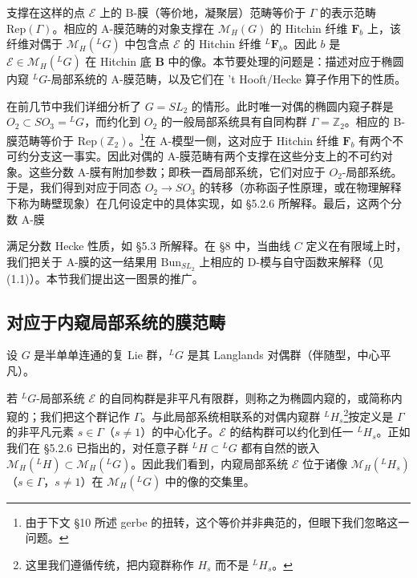 \documentclass[11pt,a4paper]{article}
\newcommand{\Bun}{\mathrm{Bun}}
\begin{document}
支撑在这样的点 $\mathcal{E}$ 上的 B-膜（等价地，凝聚层）范畴等价于 $\Gamma$ 的表示范畴 $\mathrm{Rep}(\Gamma)$。相应的 A-膜范畴的对象支撑在 $\mathcal{M}_H(G)$ 的 Hitchin 纤维 $\boldsymbol{F}_b$ 上，该纤维对偶于 $\mathcal{M}_H({}^{L}G)$ 中包含点 $\mathcal{E}$ 的 Hitchin 纤维 ${}^{L}\boldsymbol{F}_b$。因此 $b$ 是 $\mathcal{E}\in\mathcal{M}_H({}^{L}G)$ 在 Hitchin 底 $\boldsymbol{B}$ 中的像。本节要处理的问题是：描述对应于椭圆内窥 ${}^{L}G$-局部系统的 A-膜范畴，以及它们在 't Hooft/Hecke 算子作用下的性质。

在前几节中我们详细分析了 $G=SL_2$ 的情形。此时唯一对偶的椭圆内窥子群是 $O_2\subset SO_3={}^{L}G$，而约化到 $O_2$ 的一般局部系统具有自同构群 $\Gamma=\mathbb{Z}_2$。相应的 B-膜范畴等价于 $\mathrm{Rep}(\mathbb{Z}_2)$。\footnote{由于下文 §10 所述 gerbe 的扭转，这个等价并非典范的，但眼下我们忽略这一问题。}在 A-模型一侧，这对应于 Hitchin 纤维 $\boldsymbol{F}_b$ 有两个不可约分支这一事实。因此对偶的 A-膜范畴有两个支撑在这些分支上的不可约对象。这些分数 A-膜有附加参数；即秩一酉局部系统，它们对应于 $O_2$-局部系统。于是，我们得到对应于同态 $O_2\to SO_3$ 的转移（亦称函子性原理，或在物理解释下称为畴壁现象）在几何设定中的具体实现，如 §5.2.6 所解释。最后，这两个分数 A-膜


满足分数 Hecke 性质，如 §5.3 所解释。在 §8 中，当曲线 $C$ 定义在有限域上时，我们把关于 A-膜的这一结果用 $\Bun_{SL_2}$ 上相应的 D-模与自守函数来解释（见 (1.1)）。本节我们提出这一图景的推广。

\subsection{对应于内窥局部系统的膜范畴}

设 $G$ 是半单单连通的复 Lie 群，${}^{L}G$ 是其 Langlands 对偶群（伴随型，中心平凡）。

若 ${}^{L}G$-局部系统 $\mathcal{E}$ 的自同构群是非平凡有限群，则称之为椭圆内窥的，或简称内窥的；我们把这个群记作 $\Gamma$。与此局部系统相联系的对偶内窥群 ${}^{L}H_s$\footnote{这里我们遵循传统，把内窥群称作 $H_s$ 而不是 ${}^{L}H_s$。}按定义是 $\Gamma$ 的非平凡元素 $s\in\Gamma$（$s\neq 1$）的中心化子。$\mathcal{E}$ 的结构群可以约化到任一 ${}^{L}H_s$。正如我们在 §5.2.6 已指出的，对任意子群 ${}^{L}H\subset{}^{L}G$ 都有自然的嵌入 $\mathcal{M}_H({}^{L}H)\subset\mathcal{M}_H({}^{L}G)$。因此我们看到，内窥局部系统 $\mathcal{E}$ 位于诸像 $\mathcal{M}_H({}^{L}H_s)$（$s\in\Gamma$，$s\neq 1$）在 $\mathcal{M}_H({}^{L}G)$ 中的像的交集里。
\end{document}
